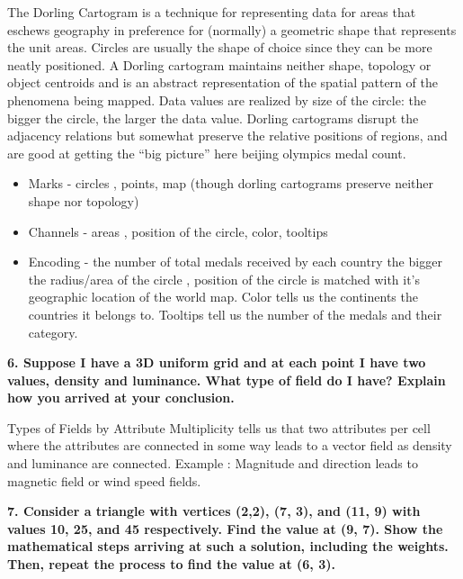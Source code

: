 \documentclass{article}[12pt]
\begin{document}
{
   	The Dorling Cartogram is a technique for representing data for areas that eschews geography in preference for (normally) a geometric shape that represents the unit areas. Circles are usually the shape of choice since they can be more neatly positioned. A Dorling cartogram maintains neither shape, topology or object centroids and is an abstract representation of the spatial pattern of the phenomena being mapped. Data values are realized by size of the circle: the bigger the circle, the larger the data value. Dorling cartograms disrupt the adjacency relations but somewhat preserve the relative positions of regions, and are good at getting the “big picture” here beijing olympics medal count. 

   	\begin{itemize}
		\item Marks - circles , points, map (though dorling cartograms preserve neither shape nor topology) 
		\item Channels - areas , position of the circle, color, tooltips
		\item Encoding - the number of total medals received by each country the bigger the radius/area of the circle , position of the circle is matched with it's geographic location of the world map. Color tells us the continents the countries it belongs to. Tooltips tell us the number of the medals and their category.
	\end{itemize}

}

\vspace{2ex}\noindent
{ \bf 6. Suppose I have a 3D uniform grid and at each point I have two values, density and luminance. What type of field do I have? Explain how you arrived at your conclusion.}

{   
	Types of Fields by Attribute Multiplicity tells us that two attributes per cell where the attributes are connected in some way leads to a vector field as density and luminance are connected. Example : Magnitude and direction leads to magnetic field or wind speed fields. 
}

\vspace{2ex}\noindent
{ \bf 7. Consider a triangle with vertices (2,2), (7, 3), and (11, 9) with values 10, 25, and 45 respectively. Find the value at (9, 7). Show the mathematical steps arriving at such a solution, including the weights. Then, repeat the process to find the value at (6, 3). }
\end{document}
